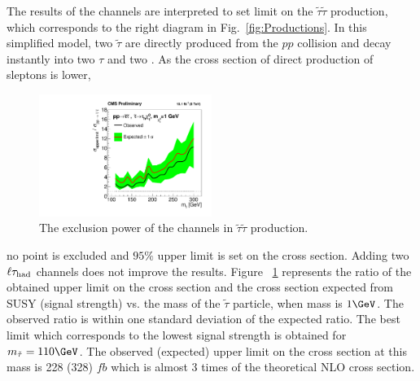 The results of the \tauTau channels are interpreted to set limit on the $\tilde{\tau}\tilde{\tau}$ production, which corresponds to the right diagram in Fig.~\ref{fig:Productions}. In this simplified model, two $\tilde{\tau}$ are directly produced from the $pp$ collision and decay instantly into two $\tau$ and two \PSGczDo. As the cross section of direct production of sleptons is lower,
\begin{linenomath}
\begin{figure}[h]
\centering
\includegraphics[width=0.5\textwidth,keepaspectratio=true]{StatisticsFig/ExclusionSTauSTauLsp1.pdf}
\caption{The exclusion power of the \tauTau channels in $\tilde{\tau}\tilde{\tau}$ production.}
\label{fig:limit_stau_stau}
\end{figure}
\end{linenomath}
 no point is excluded and $95\%$ upper limit is set on the cross section. Adding two $\ell\tau_{\rm had}$ channels does not improve the results.
Figure ~\ref{fig:limit_stau_stau} represents the ratio of the 
obtained upper limit on the cross section and the cross section expected from SUSY (signal strength) vs. the mass of the $\tilde{\tau}$ particle, when \PSGczDo mass is $1 \GeV$.
The observed ratio is within one standard deviation of  the expected ratio.
The best limit which corresponds to the lowest signal strength is obtained for $m_{\tilde{\tau}}=110 \GeV$. The observed (expected) upper limit on the cross section at this mass is 228 (328) $fb$ which is almost 3 times of the theoretical NLO cross section.





